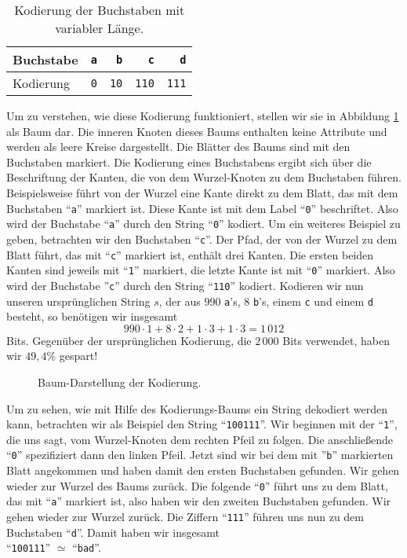 \begin{table}[htbp]
  \centering
\begin{tabular}[t]{|l|r|r|r|r|}
\hline
Buchstabe & \texttt{a} & \texttt{b}  & \texttt{c}   & \texttt{d}   \\
\hline
Kodierung & \texttt{0} & \texttt{10} & \texttt{110} & \texttt{111} \\
\hline
\end{tabular}
  \caption{Kodierung der Buchstaben mit variabler L\"ange.}
  \label{tab:coding}
\end{table}

Um zu verstehen, wie diese Kodierung funktioniert, stellen wir sie in
Abbildung \ref{fig:coding-tree} als Baum dar.  Die inneren 
Knoten dieses Baums enthalten keine Attribute und werden als leere Kreise dargestellt.
Die Bl\"atter des Baums sind mit den Buchstaben markiert.
Die Kodierung eines Buchstabens ergibt sich \"uber die Beschriftung der Kanten, die von dem
Wurzel-Knoten zu dem Buchstaben f\"uhren.  Beispielsweise f\"uhrt von der Wurzel eine
Kante direkt zu dem Blatt, das mit dem Buchstaben ``\texttt{a}'' markiert ist.  Diese
Kante ist mit dem Label ``\texttt{0}'' beschriftet.  Also wird der Buchstabe
``\texttt{a}'' durch den String ``\texttt{0}'' kodiert.  Um ein weiteres Beispiel zu
geben, betrachten wir den Buchstaben ``\texttt{c}''.   Der Pfad, der von der Wurzel zu dem
Blatt f\"uhrt, das mit ``\texttt{c}'' markiert ist, enth\"alt drei Kanten.  Die ersten beiden
Kanten sind jeweils mit ``\texttt{1}'' markiert, die letzte Kante ist mit ``\texttt{0}''
markiert.  Also wird der Buchstabe ''\texttt{c}'' durch den String ``\texttt{110}''
kodiert.  Kodieren wir nun unseren urspr\"unglichen String $s$, der aus $990$
\texttt{a}'s, $8$ \texttt{b}'s, einem \texttt{c} und einem \texttt{d} besteht, so
ben\"otigen wir insgesamt
\[ 990 \cdot 1 + 8 \cdot 2 + 1 \cdot 3 + 1 \cdot 3 = 1\,012 \]
Bits.  Gegen\"uber der urspr\"unglichen Kodierung, die $2\,000$ Bits verwendet, haben wir $49,4\%$
gespart!

\begin{figure}[!ht]
  \centering
  \caption{Baum-Darstellung der Kodierung.}
  \label{fig:coding-tree}
\end{figure}

Um zu sehen, wie mit Hilfe des Kodierungs-Baums ein String dekodiert werden kann,
betrachten wir als Beispiel den String ``\texttt{100111}''.  Wir beginnen mit der
``\texttt{1}'', die uns sagt, vom Wurzel-Knoten dem rechten Pfeil zu folgen.  Die
anschlie{\ss}ende ``\texttt{0}'' spezifiziert dann den linken Pfeil.  Jetzt sind wir bei dem
mit ''\texttt{b}'' markierten Blatt angekommen und haben damit den ersten Buchstaben
gefunden.  Wir gehen wieder zur Wurzel des Baums zur\"uck. Die folgende ``\texttt{0}'' f\"uhrt
uns zu dem Blatt, das mit ``\texttt{a}'' markiert ist, also haben wir den zweiten
Buchstaben gefunden. Wir gehen wieder zur Wurzel zur\"uck.  Die Ziffern ``\texttt{111}''
f\"uhren uns nun zu dem Buchstaben ``\texttt{d}''.  Damit haben wir insgesamt
\\[0.2cm]
\hspace*{1.3cm}
``\texttt{100111}'' $\simeq$ ``\texttt{bad}''.


